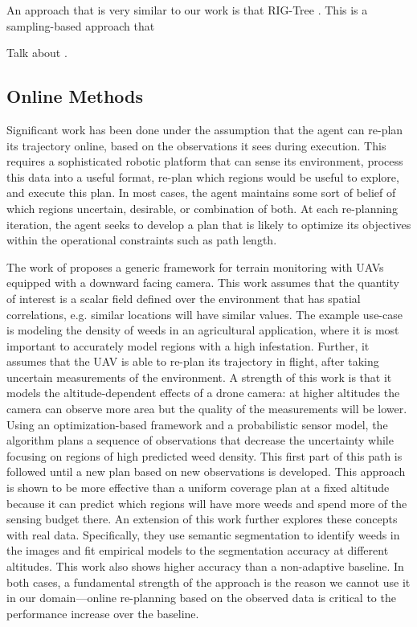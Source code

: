 An approach that is very similar to our work is that RIG-Tree \cite{Hollinger2014Sampling-basedAlgorithms}. This is a sampling-based approach that 

Talk about \cite{GhaffariJadidi2019Sampling-basedMonitoring}.

\subsection{Online Methods}
Significant work has been done under the assumption that the agent can re-plan its trajectory online, based on the observations it sees during execution. This requires a sophisticated robotic platform that can sense its environment, process this data into a useful format, re-plan which regions would be useful to explore, and execute this plan. In most cases, the agent maintains some sort of belief of which regions uncertain, desirable, or combination of both. At each re-planning iteration, the agent seeks to develop a plan that is likely to optimize its objectives within the operational constraints such as path length.

The work of \cite{Popovic2020} proposes a generic framework for terrain monitoring with UAVs equipped with a downward facing camera. This work assumes that the quantity of interest is a scalar field defined over the environment that has spatial correlations, e.g. similar locations will have similar values. The example use-case is modeling the density of weeds in an agricultural application, where it is most important to accurately model regions with a high infestation. Further, it assumes that the UAV is able to re-plan its trajectory in flight, after taking uncertain measurements of the environment. A strength of this work is that it models the altitude-dependent effects of a drone camera: at higher altitudes the camera can observe more area but the quality of the measurements will be lower. Using an optimization-based framework and a probabilistic sensor model, the algorithm plans a sequence of observations that decrease the uncertainty while focusing on regions of high predicted weed density. This first part of this path is followed until a new plan based on new observations is developed. This approach is shown to be more effective than a uniform coverage plan at a fixed altitude because it can predict which regions will have more weeds and spend more of the sensing budget there. An extension of this work \cite{Stache2021AdaptiveSegmentation} further explores these concepts with real data. Specifically, they use semantic segmentation to identify weeds in the images and fit empirical models to the segmentation accuracy at different altitudes. This work also shows higher accuracy than a non-adaptive baseline. In both cases, a fundamental strength of the approach is the reason we cannot use it in our domain---online re-planning based on the observed data is critical to the performance increase over the baseline.

